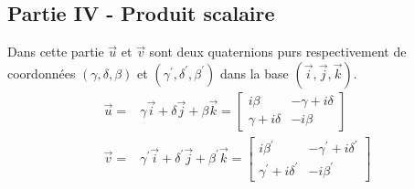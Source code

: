 \subsection*{Partie IV - Produit scalaire}
Dans cette partie $\overrightarrow{u}$ et $\overrightarrow{v}$ sont deux quaternions purs respectivement de coordonnées $(\gamma , \delta , \beta)$ et $(\gamma^\prime , \delta^\prime , \beta^\prime)$ dans la base 
$(\overrightarrow{i} , \overrightarrow{j} , \overrightarrow{k})$.
\begin{align*}
 \overrightarrow{u} =&
\gamma \overrightarrow{i} +\delta \overrightarrow{j} + \beta \overrightarrow{k}
=
\begin{bmatrix}
i\beta  & -\gamma + i\delta \\
\gamma + i\delta  & -i\beta
\end{bmatrix}
\\
 \overrightarrow{v}
=& 
\gamma^\prime \overrightarrow{i} +\delta^\prime \overrightarrow{j} + \beta^\prime \overrightarrow{k}
=
\begin{bmatrix}
i\beta^\prime  & -\gamma^\prime + i\delta^\prime \\
\gamma^\prime + i\delta^\prime  & -i\beta^\prime
\end{bmatrix}
\end{align*}

